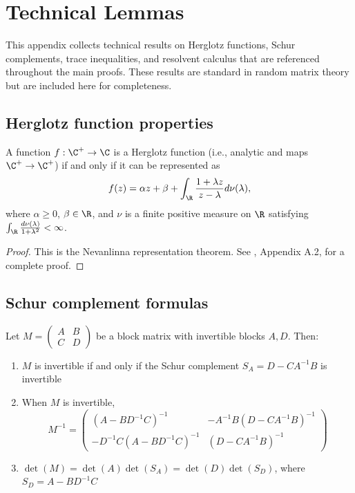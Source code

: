 
\section{Technical Lemmas}

This appendix collects technical results on Herglotz functions, Schur complements, trace inequalities, and resolvent calculus that are referenced throughout the main proofs. These results are standard in random matrix theory but are included here for completeness.

\subsection{Herglotz function properties}

\begin{lemma}\label{lem:herglotz-char}
A function $f: \C^+ \to \C$ is a Herglotz function (i.e., analytic and maps $\C^+ \to \C^+$) if and only if it can be represented as
\[
f(z) = \alpha z + \beta + \int_\R \frac{1 + \lambda z}{z - \lambda} d\nu(\lambda),
\]
where $\alpha \geq 0$, $\beta \in \R$, and $\nu$ is a finite positive measure on $\R$ satisfying $\int_\R \frac{d\nu(\lambda)}{1 + \lambda^2} < \infty$.
\end{lemma}

\begin{proof}
This is the Nevanlinna representation theorem. See \cite{anderson2010introduction}, Appendix A.2, for a complete proof.
\end{proof}

\subsection{Schur complement formulas}

\begin{lemma}\label{lem:schur-general}
Let $M = \begin{pmatrix} A & B \\ C & D \end{pmatrix}$ be a block matrix with invertible blocks $A, D$. Then:
\begin{enumerate}
\item $M$ is invertible if and only if the Schur complement $S_A = D - CA^{-1}B$ is invertible
\item When $M$ is invertible,
\[
M^{-1} = \begin{pmatrix} (A - BD^{-1}C)^{-1} & -A^{-1}B(D - CA^{-1}B)^{-1} \\
-D^{-1}C(A - BD^{-1}C)^{-1} & (D - CA^{-1}B)^{-1} \end{pmatrix}
\]
\item $\det(M) = \det(A) \det(S_A) = \det(D) \det(S_D)$, where $S_D = A - BD^{-1}C$
\end{enumerate}
\end{lemma}

